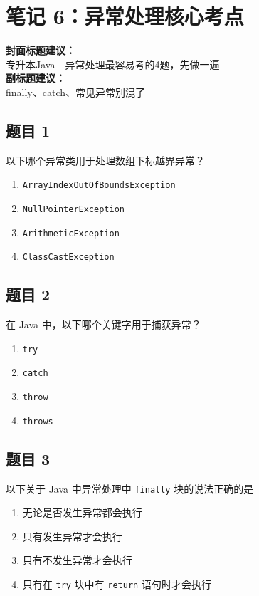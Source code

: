 \documentclass[12pt,a4paper]{ctexart}
\begin{document}
\newpage

\section{笔记 6：异常处理核心考点}
\begin{coverbox}
\textbf{封面标题建议：}\\
专升本Java｜异常处理最容易考的4题，先做一遍\\
\textbf{副标题建议：}\\
finally、catch、常见异常别混了
\end{coverbox}

\subsection*{题目 1}
以下哪个异常类用于处理数组下标越界异常？
\begin{enumerate}[label=\Alph*.]
    \item \texttt{ArrayIndexOutOfBoundsException}
    \item \texttt{NullPointerException}
    \item \texttt{ArithmeticException}
    \item \texttt{ClassCastException}
\end{enumerate}

\subsection*{题目 2}
在 Java 中，以下哪个关键字用于捕获异常？
\begin{enumerate}[label=\Alph*.]
    \item \texttt{try}
    \item \texttt{catch}
    \item \texttt{throw}
    \item \texttt{throws}
\end{enumerate}

\subsection*{题目 3}
以下关于 Java 中异常处理中 \texttt{finally} 块的说法正确的是
\begin{enumerate}[label=\Alph*.]
    \item 无论是否发生异常都会执行
    \item 只有发生异常才会执行
    \item 只有不发生异常才会执行
    \item 只有在 \texttt{try} 块中有 \texttt{return} 语句时才会执行
\end{enumerate}
\end{document}
